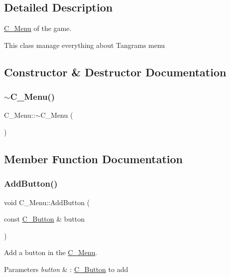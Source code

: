 \subsection{Detailed Description}
\hyperlink{classC__Menu}{C\+\_\+\+Menu} of the game. 

This class manage everything about Tangram\textquotesingle{}s menu 

\subsection{Constructor \& Destructor Documentation}
\mbox{\label{classC__Menu_a4b1250911f29522e9766f5ad2f02b595}} 
\subsubsection{\texorpdfstring{$\sim$\+C\+\_\+\+Menu()}{~C\_Menu()}}
{\footnotesize\ttfamily C\+\_\+\+Menu\+::$\sim$\+C\+\_\+\+Menu (\begin{DoxyParamCaption}{ }\end{DoxyParamCaption})}



\subsection{Member Function Documentation}
\mbox{\label{classC__Menu_a9a4f7a0022f39f35b7af9c5d2b6f31ec}} 
\subsubsection{\texorpdfstring{Add\+Button()}{AddButton()}}
{\footnotesize\ttfamily void C\+\_\+\+Menu\+::\+Add\+Button (\begin{DoxyParamCaption}\item[{const \hyperlink{classC__Button}{C\+\_\+\+Button} \&}]{button }\end{DoxyParamCaption})}



Add a button in the \hyperlink{classC__Menu}{C\+\_\+\+Menu}. 


\begin{DoxyParams}{Parameters}
{\em button} & \+: \hyperlink{classC__Button}{C\+\_\+\+Button} to add \\
\hline
\end{DoxyParams}
\mbox{\label{classC__Menu_a9529be708fad2c6deca21034bc37f59d}} 
